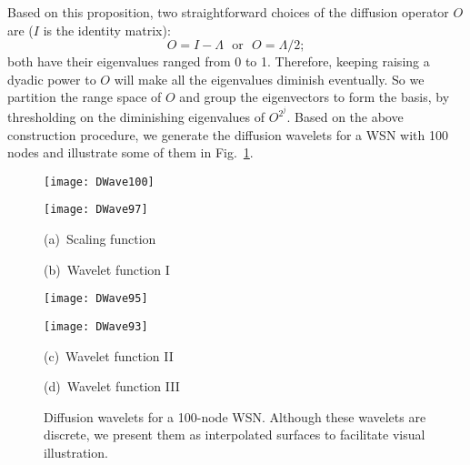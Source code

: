 \documentclass[conference]{IEEEtran}
\begin{document}
      Based on this proposition, two straightforward choices of the diffusion operator $O$ are ($I$ is the identity matrix):
\[O = I - \Lambda~~~\mathrm{or}~~~O = \Lambda/2;\]
both have their eigenvalues ranged from 0 to 1. Therefore, keeping raising a dyadic power to $O$ will make all the eigenvalues diminish eventually. So we partition the range space of $O$ and group the eigenvectors to form the basis, by thresholding on the diminishing eigenvalues of $O^{2^j}$. Based on the above construction procedure, we generate the diffusion wavelets for a WSN with 100 nodes and illustrate some of them in Fig.~\ref{fig:dwave}.
      \begin{figure}[htb]
\parbox{\columnwidth}{\parbox{.49\columnwidth}{\center\texttt{[image: DWave100]}}
                              \parbox{.49\columnwidth}{\center\texttt{[image: DWave97]}}}
        \parbox{\columnwidth}{\parbox{.49\columnwidth}{\center\scriptsize(a)~Scaling function}
                              \parbox{.49\columnwidth}{\center\scriptsize(b)~Wavelet function I}}
        \parbox{\columnwidth}{\parbox{.49\columnwidth}{\center\texttt{[image: DWave95]}}
                              \parbox{.49\columnwidth}{\center\texttt{[image: DWave93]}}}
        \parbox{\columnwidth}{\parbox{.49\columnwidth}{\center\scriptsize(c)~Wavelet function II}
                              \parbox{.49\columnwidth}{\center\scriptsize(d)~Wavelet function III}}
        \caption{Diffusion wavelets for a 100-node WSN. Although these wavelets are discrete, we present them as interpolated surfaces to facilitate visual illustration.} \label{fig:dwave}
\end{figure}
\end{document}
